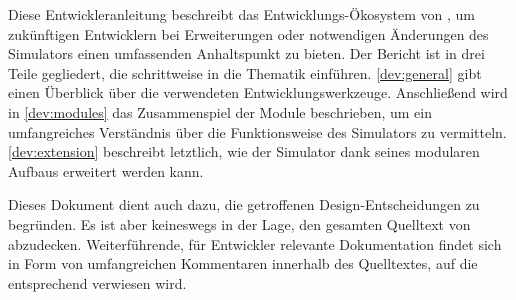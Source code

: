 
Diese Entwickleranleitung beschreibt das Entwicklungs-Ökosystem von \erasim{},
um zukünftigen Entwicklern bei Erweiterungen oder notwendigen Änderungen des
Simulators einen umfassenden Anhaltspunkt zu bieten. Der Bericht ist in drei
Teile gegliedert, die schrittweise in die Thematik einführen.
\autoref{dev:general} gibt einen Überblick über die verwendeten
Entwicklungswerkzeuge. Anschließend wird in \autoref{dev:modules} das
Zusammenspiel der Module beschrieben, um ein umfangreiches Verständnis über die
Funktionsweise des Simulators zu vermitteln. \autoref{dev:extension} beschreibt
letztlich, wie der Simulator dank seines modularen Aufbaus erweitert werden
kann.

Dieses Dokument dient auch dazu, die getroffenen Design-Entscheidungen zu
begründen. Es ist aber keineswegs in der Lage, den gesamten Quelltext von
\erasim{} abzudecken. Weiterführende, für Entwickler relevante Dokumentation
findet sich in Form von umfangreichen Kommentaren innerhalb des Quelltextes, auf
die entsprechend verwiesen wird.
